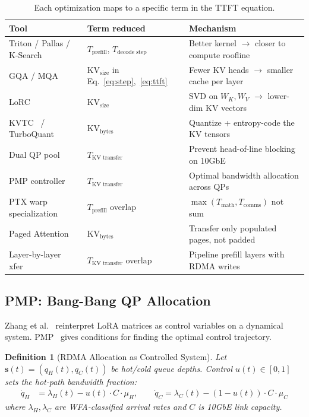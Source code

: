 \documentclass[11pt]{article}
\newtheorem{definition}{Definition}
\begin{document}
\begin{table}[ht]
\centering\small
\begin{tabular}{lll}
\toprule
\textbf{Tool} & \textbf{Term reduced} & \textbf{Mechanism} \\
\midrule
Triton / Pallas / K-Search & $T_{\text{prefill}}$, $T_{\text{decode step}}$ & Better kernel $\to$ closer to compute roofline \\
GQA / MQA~\cite{shazeer2019mqA,ainslie2023gqa} & $\text{KV}_{\text{size}}$ in Eq.~\ref{eq:step},~\ref{eq:ttft} & Fewer KV heads $\to$ smaller cache per layer \\
LoRC~\cite{zhang2024lorc} & $\text{KV}_{\text{size}}$ & SVD on $W_K, W_V$ $\to$ lower-dim KV vectors \\
KVTC~\cite{kvtc2024} / TurboQuant~\cite{turboquant2026} & $\text{KV}_{\text{bytes}}$ & Quantize + entropy-code the KV tensors \\
Dual QP pool & $T_{\text{KV transfer}}$ & Prevent head-of-line blocking on 10GbE \\
PMP controller & $T_{\text{KV transfer}}$ & Optimal bandwidth allocation across QPs \\
PTX warp specialization~\cite{dhmnr_ptx} & $T_{\text{prefill}}$ overlap & $\max(T_{\text{math}}, T_{\text{comms}})$ not sum \\
Paged Attention~\cite{vllm_paged} & $\text{KV}_{\text{bytes}}$ & Transfer only populated pages, not padded \\
Layer-by-layer xfer~\cite{chen2025transferengine} & $T_{\text{KV transfer}}$ overlap & Pipeline prefill layers with RDMA writes \\
\bottomrule
\end{tabular}
\caption{Each optimization maps to a specific term in the TTFT equation.}
\end{table}

\subsection{PMP: Bang-Bang QP Allocation}

Zhang et al.~\cite{zhang2024optcontrol} reinterpret LoRA matrices as control variables on a dynamical system. PMP~\cite{pontryagin2018,bellman1956} gives conditions for finding the optimal control trajectory.

\begin{definition}[RDMA Allocation as Controlled System]
Let $\mathbf{s}(t) = (q_H(t), q_C(t))$ be hot/cold queue depths. Control $u(t) \in [0, 1]$ sets the hot-path bandwidth fraction:
\begin{align}
\dot{q}_H &= \lambda_H(t) - u(t) \cdot C \cdot \mu_H, \qquad
\dot{q}_C = \lambda_C(t) - (1 - u(t)) \cdot C \cdot \mu_C
\end{align}
where $\lambda_H, \lambda_C$ are WFA-classified arrival rates and $C$ is 10GbE link capacity.
\end{definition}
\end{document}
